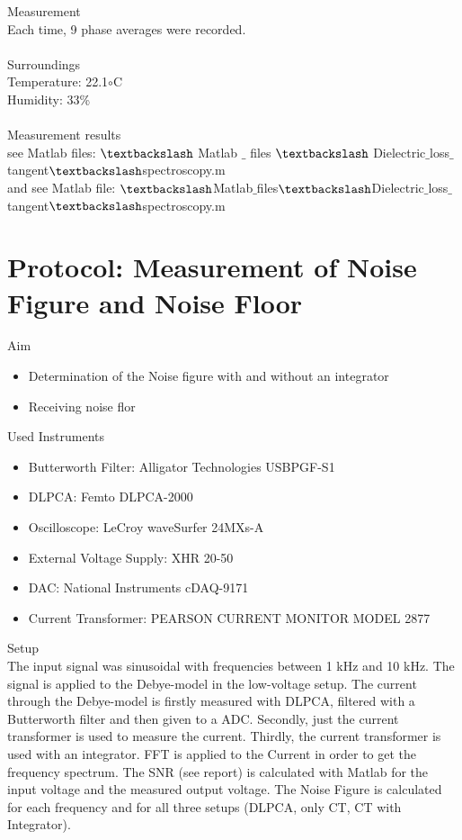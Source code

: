 {\Large Measurement} \\
Each time, 9 phase averages were recorded.\\ 
\\
{\Large  Surroundings} \\
Temperature: 22.1$\circ$C\\
Humidity: 33\%\\
\\
{\Large Measurement results}\\
see Matlab files: $\textbackslash$ Matlab $\_$ files $\textbackslash$ Dielectric$\_$loss$\_$tangent$\textbackslash$spectroscopy.m\\
and see Matlab file: $\textbackslash$Matlab$\_$files$\textbackslash$Dielectric$\_$loss$\_$tangent$\textbackslash$spectroscopy.m


\section{Protocol: Measurement of Noise Figure and Noise Floor}
{\Large Aim}
\begin{itemize}
\item Determination of the Noise figure with and without an integrator 
\item Receiving noise flor 
\end{itemize}
{\Large Used Instruments}
\begin{itemize}
 \item Butterworth Filter: Alligator Technologies USBPGF-S1
 \item DLPCA: Femto DLPCA-2000
 \item Oscilloscope: LeCroy waveSurfer 24MXs-A
 \item External Voltage Supply:  XHR 20-50
 \item DAC: National Instruments cDAQ-9171
 \item Current Transformer: PEARSON CURRENT
MONITOR MODEL 2877
\end{itemize}
{\Large Setup} \\
The input signal was  sinusoidal with frequencies between 1 kHz and 10 kHz. The signal is applied to the Debye-model in the low-voltage setup. The current through the Debye-model is firstly measured with DLPCA, filtered with a Butterworth filter and then given to a ADC. Secondly, just the current transformer is used to measure the current. Thirdly, the current transformer is used with an integrator.  FFT is applied to the Current in order to get the frequency spectrum. The SNR (see report) is calculated with Matlab for the input voltage and the measured output voltage. The Noise Figure is calculated for each frequency and for all three setups (DLPCA, only CT, CT with Integrator).\\
